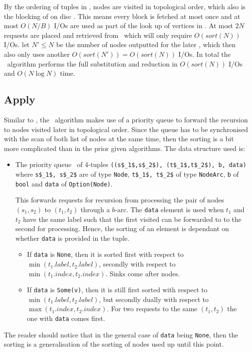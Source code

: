 By the ordering of tuples in \SubstituteQrec, nodes are visited in topological
order, which also is the blocking of on disc \GV. This means every block is
fetched at most once and at most $O(N/B)$ I/Os are used as part of the look up
of vertices in \GV. At most $2N$ requests are placed and retrieved from \Q\
which will only require $O(sort(N))$ I/Os. let $N' \leq N$ be the number of
nodes outputted for the later \Reduce, which then also only uses another
$O(sort(N')) = O(sort(N))$ I/Os. In total the \Substitute\ algorithm performs
the full substitution and reduction in $O(sort(N))$ I/Os and $O(N \log N)$ time.

\subsection{Apply}
Similar to \Substitute, the \Apply\ algorithm makes use of a priority queue
to forward the recursion to nodes visited later in topological order. Since the
queue has to be synchronised with the scan of both list of nodes at the same
time, then the sorting is a bit more complicated than in the prior given
algorithms. The data structure used is:
\begin{itemize}
\item The priority queue \ApplyQrec\ of 4-tuples \lstinline{((s$_1$,s$_2$), (t$_1$,t$_2$), b, data)}
  where \lstinline{s$_1$, s$_2$} are of type \lstinline{Node}, \lstinline{t$_1$, t$_2$}
  of type \lstinline{NodeArc}, \lstinline{b} of \lstinline{bool} and
  \lstinline{data} of \lstinline{Option(Node)}.

  This forwards requests for recursion from processing the pair of nodes $(s_1,
  s_2)$ to $(t_1,t_2)$ through a $b$-arc. The \lstinline{data} element is used
  when $t_1$ and $t_2$ have the same label such that the first visited can be
  forwarded to to the second for processing. Hence, the sorting of an element is
  dependant on whether \lstinline{data} is provided in the tuple.

  \begin{itemize}
  \item If \lstinline{data} is \lstinline{None}, then it is sorted first with
    respect to $\min(t_1.\mathit{label},t_2.\mathit{label})$, secondly with
    respect to $\min(t_1.\mathit{index},t_2.\mathit{index})$. Sinks come after
    nodes.

  \item If \lstinline{data} is \lstinline{Some(v)}, then it is still first
    sorted with respect to $\min(t_1.\mathit{label},t_2.\mathit{label})$, but
    secondly dually with respect to $\max(t_1.\mathit{index},
    t_2.\mathit{index})$. For two requests to the same $(t_1,t_2)$ the one with
    \lstinline{data} comes first.
  \end{itemize}
\end{itemize}
The reader should notice that in the general case of \lstinline{data} being
\lstinline{None}, then the sorting is a generalisation of the sorting of nodes
used up until this point.

